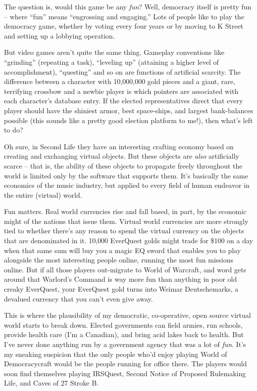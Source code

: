 The question is, would this game be any \emph{fun}? Well,
democracy itself is pretty fun -- where ``fun'' means ``engrossing and
engaging.'' Lots of people like to play the democracy game, whether
by voting every four years or by moving to K Street and setting up
a lobbying operation.

But video games aren't quite the same thing. Gameplay conventions
like ``grinding'' (repeating a task), ``leveling up'' (attaining a
higher level of accomplishment), ``questing'' and so on are functions
of artificial scarcity. The difference between a character with
10,000,000 gold pieces and a giant, rare, terrifying crossbow and a
newbie player is which pointers are associated with each
character's database entry. If the elected representatives direct
that every player should have the shiniest armor, best space-ships,
and largest bank-balances possible (this sounds like a pretty good
election platform to me!), then what's left to do?

Oh sure, in Second Life they have an interesting crafting economy
based on creating and exchanging virtual objects. But these objects
are \emph{also} artificially scarce -- that is, the ability of
these objects to propagate freely throughout the world is limited
only by the software that supports them. It's basically the same
economics of the music industry, but applied to every field of
human endeavor in the entire (virtual) world.

Fun matters. Real world currencies rise and fall based, in part, by
the economic might of the nations that issue them. Virtual world
currencies are more strongly tied to whether there's any reason to
spend the virtual currency on the objects that are denominated in
it. 10,000 EverQuest golds might trade for \$100 on a day when that
same sum will buy you a magic EQ sword that enables you to play
alongside the most interesting people online, running the most fun
missions online. But if all those players out-migrate to World of
Warcraft, and word gets around that Warlord's Command is way more
fun than anything in poor old creaky EverQuest, your EverQuest gold
turns into Weimar Deutschemarks, a devalued currency that you can't
even give away.

This is where the plausibility of my democratic, co-operative, open
source virtual world starts to break down. Elected governments can
field armies, run schools, provide health care (I'm a Canadian),
and bring acid lakes back to health. But I've never done anything
run by a government agency that was a lot of \emph{fun}. It's my
sneaking suspicion that the only people who'd enjoy playing World
of Democracycraft would be the people running for office there. The
players would soon find themselves playing IRSQuest, Second Notice
of Proposed Rulemaking Life, and Caves of 27 Stroke B.

